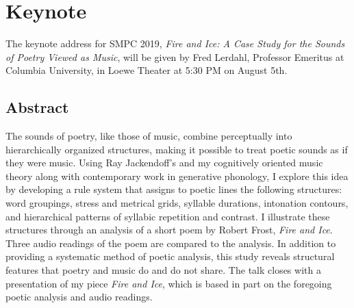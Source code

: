 \newpage
\section*{Keynote}


The keynote address for SMPC 2019, \textit{Fire and Ice: A Case Study for the Sounds of Poetry Viewed as Music}, will be given by Fred Lerdahl, Professor Emeritus at Columbia University, in Loewe Theater at 5:30 PM on August 5th.


\subsection*{Abstract}

The sounds of poetry, like those of music, combine perceptually into hierarchically organized structures, making it possible to treat poetic sounds as if they were music. Using Ray Jackendoff's and my cognitively oriented music theory along with contemporary work in generative phonology, I explore this idea by developing a rule system that assigns to poetic lines the following structures: word groupings, stress and metrical grids, syllable durations, intonation contours, and hierarchical patterns of syllabic repetition and contrast. I illustrate these structures through an analysis of a short poem by Robert Frost, {\it Fire and Ice}. Three audio readings of the poem are compared to the analysis. In addition to providing a systematic method of poetic analysis, this study reveals structural features that poetry and music do and do not share. The talk closes with a presentation of my piece {\it Fire and Ice}, which is based in part on the foregoing poetic analysis and audio readings.


